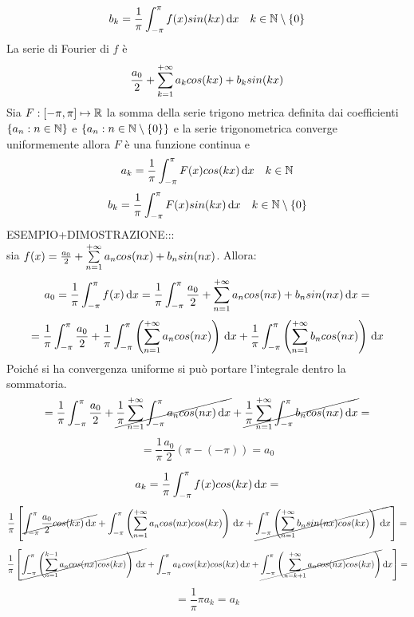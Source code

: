 \[b_k=\frac{1}{\pi}\int_{-\pi}^{\pi}f(x)sin(kx)\,\mathrm{d}{x}\quad k\in\mathbb{N}\setminus{\left\{0\right\}}\]
La serie di Fourier di $f$ è
\[\frac{a_0}{2}+\sum\limits_{k=1}^{+\infty}a_{k}cos(kx)+b_{k}sin(kx)\]
\proposition
Sia $F: \left[-\pi,\pi\right] \mapsto \mathbb{R}$ la somma della serie trigono metrica definita dai coefficienti $\left\{a_n:n\in\mathbb{N}\right\}$ e $\left\{a_n:n\in\mathbb{N}\setminus{\left\{0\right\}}\right\}$ e la serie trigonometrica converge uniformemente allora $F$ è una funzione continua e
\[a_k=\frac{1}{\pi}\int_{-\pi}^{\pi}F(x)cos(kx)\,\mathrm{d}{x}\quad k\in\mathbb{N}\]
\[b_k=\frac{1}{\pi}\int_{-\pi}^{\pi}F(x)sin(kx)\,\mathrm{d}{x}\quad k\in\mathbb{N}\setminus{\left\{0\right\}}\]
ESEMPIO+DIMOSTRAZIONE:::\\
sia $f(x)=\frac{a_0}{2}+\sum\limits_{n=1}^{+\infty}a_{n}cos(nx)+b_{n}sin(nx)$. Allora:\\
\[a_0=\frac{1}{\pi}\int_{-\pi}^{\pi}f(x)\,\mathrm{d}{x}=\frac{1}{\pi}\int_{-\pi}^{\pi}\frac{a_0}{2}+\sum\limits_{n=1}^{+\infty}a_{n}cos(nx)+b_{n}sin(nx)\,\mathrm{d}{x}=\]
\[
= \frac{1}{\pi}\int_{-\pi}^{\pi}\frac{a_0}{2} +
\frac{1}{\pi}\int_{-\pi}^{\pi}\left(\sum\limits_{n=1}^{+\infty} a_ncos(nx)\right)\,\mathrm{d}{x} +
\frac{1}{\pi}\int_{-\pi}^{\pi}\left(\sum\limits_{n=1}^{+\infty} b_ncos(nx)\right)\,\mathrm{d}{x}
\]
Poiché si ha convergenza uniforme si può portare l'integrale dentro la sommatoria.
\[
= \frac{1}{\pi}\int_{-\pi}^{\pi}\frac{a_0}{2} +
\cancel{\frac{1}{\pi}\sum\limits_{n=1}^{+\infty}\int_{-\pi}^{\pi} a_ncos(nx)\,\mathrm{d}{x}} +
\cancel{\frac{1}{\pi}\sum\limits_{n=1}^{+\infty}\int_{-\pi}^{\pi} b_ncos(nx)\,\mathrm{d}{x}}=
\]
\[=\frac{1}{\pi}\frac{a_0}{2}\left(\pi-(-\pi)\right)=a_0\]


\[a_k=\frac{1}{\pi}\int_{-\pi}^{\pi}f(x)cos(kx)\,\mathrm{d}{x}=\]
\[\frac{1}{\pi}\left[
\cancel{\int_{-\pi}^{\pi}\frac{a_0}{2}cos(kx)\,\mathrm{d}{x}}+
\int_{-\pi}^{\pi}\left(\sum\limits_{n=1}^{+\infty}a_ncos(nx)cos(kx)\right)\,\mathrm{d}{x}+
\cancel{\int_{-\pi}^{\pi}\left(\sum\limits_{n=1}^{+\infty}b_nsin(nx)cos(kx)\right)\,\mathrm{d}{x}}
\right]=\]
\[\frac{1}{\pi}\left[
\cancel{\int_{-\pi}^{\pi}\left(\sum\limits_{n=1}^{k-1} a_ncos(nx)cos(kx)\right)\,\mathrm{d}{x}}+
\int_{-\pi}^{\pi}a_kcos(kx)cos(kx)\,\mathrm{d}{x}+
\cancel{\int_{-\pi}^{\pi}\left(\sum\limits_{n=k+1}^{+\infty}a_ncos(nx)cos(kx)\right)}\,\mathrm{d}{x}
\right]=\]
\[=\frac{1}{\pi}\pi a_k=a_k\]


